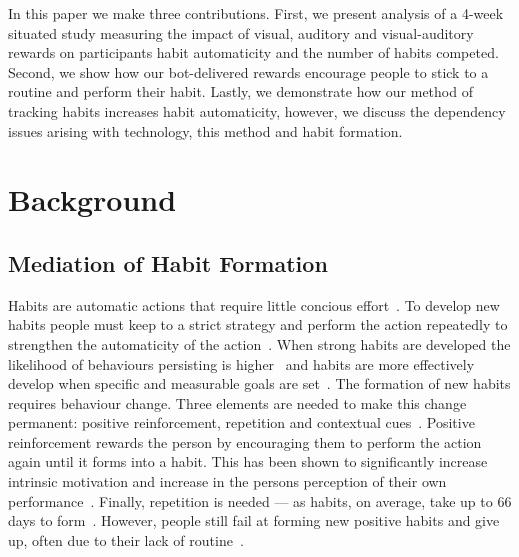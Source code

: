 \documentclass{scaffold/sigchi}
\begin{document}
In this paper we make three contributions. First, we present analysis of a 4-week situated study measuring the impact of visual, auditory and visual-auditory rewards on participants habit automaticity and the number of habits competed. Second, we show how our bot-delivered rewards encourage people to stick to a routine and perform their habit. Lastly, we demonstrate how our method of tracking habits increases habit automaticity, however, we discuss the dependency issues arising with technology, this method and habit formation.

\section{Background}
\subsection{Mediation of Habit Formation}
Habits are automatic actions that require little concious effort~\cite{article_the_habitual_consumer}. To develop new habits people must keep to a strict strategy and perform the action repeatedly to strengthen the automaticity of the action~\cite{article_promoting_habit_formation}. When strong habits are developed the likelihood of behaviours persisting is higher~\cite{putting_habit_into_practice} and habits are more effectively develop when specific and measurable goals are set~\cite{habits_better_when_have_specific_and_measurable_goals}. The formation of new habits requires behaviour change. Three elements are needed to make this change permanent: positive reinforcement, repetition and contextual cues~\cite{article_experiences_of_habit_formation}. Positive reinforcement rewards the person by encouraging them to perform the action again until it forms into a habit. This has been shown to significantly increase intrinsic motivation and increase in the persons perception of their own performance~\cite{positive_reinforcement_pro}. Finally, repetition is needed --- as habits, on average, take up to 66 days to form~\cite{article_how_habits_formed_modelling_habit_formation}.
However, people still fail at forming new positive habits and give up, often due to their lack of routine~\cite{article_promoting_habit_formation, article_the_habitual_consumer}.
\end{document}
